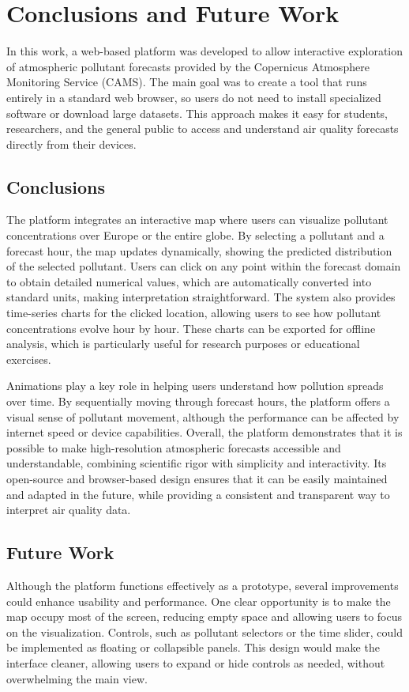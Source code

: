 \chapter[Conclusions and Future Work]{Conclusions and Future Work}
\label{Chap5}

In this work, a web-based platform was developed to allow interactive exploration of atmospheric pollutant forecasts provided by the Copernicus Atmosphere Monitoring Service (CAMS). The main goal was to create a tool that runs entirely in a standard web browser, so users do not need to install specialized software or download large datasets. This approach makes it easy for students, researchers, and the general public to access and understand air quality forecasts directly from their devices.

\section{Conclusions}
The platform integrates an interactive map where users can visualize pollutant concentrations over Europe or the entire globe. By selecting a pollutant and a forecast hour, the map updates dynamically, showing the predicted distribution of the selected pollutant. Users can click on any point within the forecast domain to obtain detailed numerical values, which are automatically converted into standard units, making interpretation straightforward. The system also provides time-series charts for the clicked location, allowing users to see how pollutant concentrations evolve hour by hour. These charts can be exported for offline analysis, which is particularly useful for research purposes or educational exercises.

Animations play a key role in helping users understand how pollution spreads over time. By sequentially moving through forecast hours, the platform offers a visual sense of pollutant movement, although the performance can be affected by internet speed or device capabilities. Overall, the platform demonstrates that it is possible to make high-resolution atmospheric forecasts accessible and understandable, combining scientific rigor with simplicity and interactivity. Its open-source and browser-based design ensures that it can be easily maintained and adapted in the future, while providing a consistent and transparent way to interpret air quality data.

\section{Future Work}
Although the platform functions effectively as a prototype, several improvements could enhance usability and performance. One clear opportunity is to make the map occupy most of the screen, reducing empty space and allowing users to focus on the visualization. Controls, such as pollutant selectors or the time slider, could be implemented as floating or collapsible panels. This design would make the interface cleaner, allowing users to expand or hide controls as needed, without overwhelming the main view.

